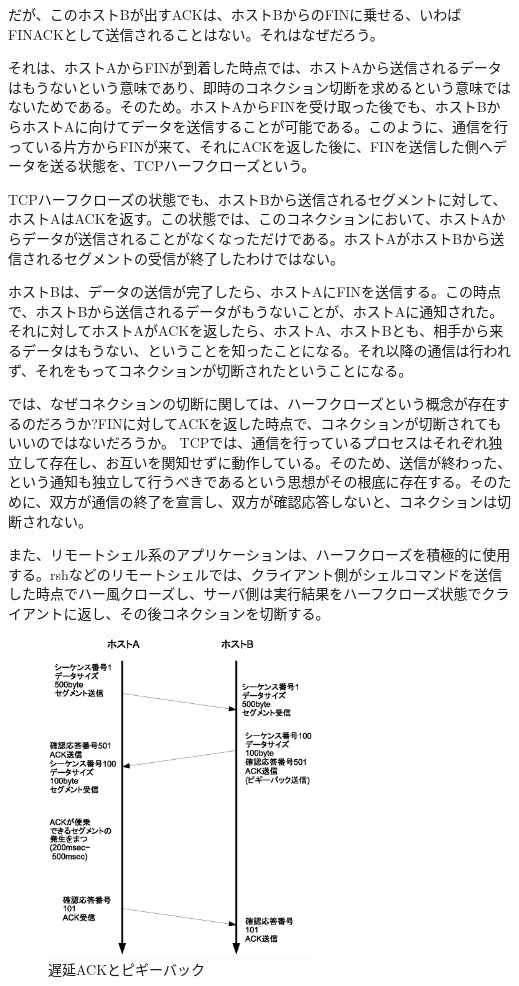 だが、このホストBが出すACKは、ホストBからのFINに乗せる、いわばFINACKとして送信されることはない。それはなぜだろう。



それは、ホストAからFINが到着した時点では、ホストAから送信されるデータはもうないという意味であり、即時のコネクション切断を求めるという意味ではないためである。そのため。ホストAからFINを受け取った後でも、ホストBからホストAに向けてデータを送信することが可能である。このように、通信を行っている片方からFINが来て、それにACKを返した後に、FINを送信した側へデータを送る状態を、TCPハーフクローズという。



TCPハーフクローズの状態でも、ホストBから送信されるセグメントに対して、ホストAはACKを返す。この状態では、このコネクションにおいて、ホストAからデータが送信されることがなくなっただけである。ホストAがホストBから送信されるセグメントの受信が終了したわけではない。




ホストBは、データの送信が完了したら、ホストAにFINを送信する。この時点で、ホストBから送信されるデータがもうないことが、ホストAに通知された。それに対してホストAがACKを返したら、ホストA、ホストBとも、相手から来るデータはもうない、ということを知ったことになる。それ以降の通信は行われず、それをもってコネクションが切断されたということになる。


では、なぜコネクションの切断に関しては、ハーフクローズという概念が存在するのだろうか?FINに対してACKを返した時点で、コネクションが切断されてもいいのではないだろうか。
TCPでは、通信を行っているプロセスはそれぞれ独立して存在し、お互いを関知せずに動作している。そのため、送信が終わった、という通知も独立して行うべきであるという思想がその根底に存在する。そのために、双方が通信の終了を宣言し、双方が確認応答しないと、コネクションは切断されない。

また、リモートシェル系のアプリケーションは、ハーフクローズを積極的に使用する。rshなどのリモートシェルでは、クライアント側がシェルコマンドを送信した時点でハー風クローズし、サーバ側は実行結果をハーフクローズ状態でクライアントに返し、その後コネクションを切断する。

\begin{figure}
	\includegraphics[width=7cm, clip]{draw/tcp03n.eps}
	\caption{遅延ACKとピギーバック}
	\label{fig:tcp03}
\end{figure}

